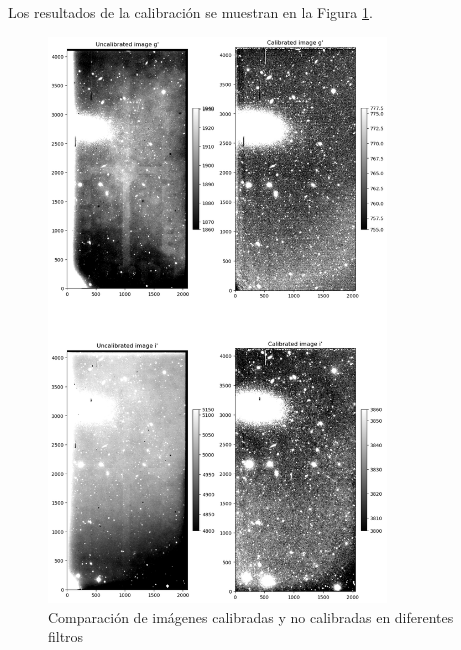  Los resultados de la calibración se muestran en la Figura \ref{fig:reduced_images}.
 
 \begin{figure}[htb]
   \centering
	 \includegraphics[width=0.8\textwidth]{figures/reduced_images.png}
	 \caption{Comparación de imágenes calibradas y no calibradas en diferentes filtros}
	 \label{fig:reduced_images} 
 \end{figure}
 
 
 
 
 
 
 
